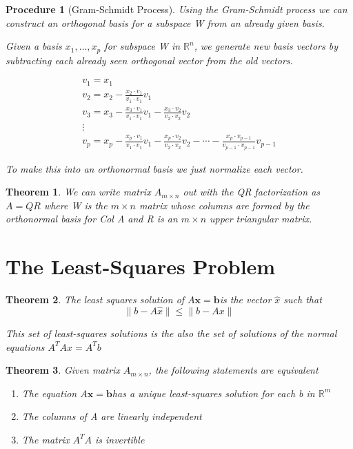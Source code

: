 \documentclass[12pt]{report}
\newtheorem{thm}{Theorem}
\newtheorem{proc}{Procedure}
\newcommand{\mtx}[3]{$#1_{#2\times #3}$}
\newcommand{\mateq}{$A\bm{x}=\bm{b}$}
\begin{document}
\begin{proc}[Gram-Schmidt Process]
Using the Gram-Schmidt process we can construct an orthogonal basis for a subspace W from an already given basis.

Given a basis ${x_1, \ldots, x_p}$ for subspace W in $\mathbb{R}^n$, we generate new basis vectors by subtracting each already seen orthogonal vector from the old vectors.

\begin{eqnarray*}
v_1 = x_1 \\
v_2 = x_2 - \frac{x_2 \cdot v_1}{v_1 \cdot v_1} v_1 \\
v_3 = x_3 - \frac{x_3 \cdot v_1}{v_1 \cdot v_1} v_1 - \frac{x_3 \cdot v_2}{v_2 \cdot v_2} v_2 \\
\vdots \\
v_p = x_p - \frac{x_p \cdot v_1}{v_1 \cdot v_1} v_1 - \frac{x_p \cdot v_2}{v_2 \cdot v_2} v_2 - \cdots - \frac{x_p \cdot v_{p-1}}{v_{p-1} \cdot v_{p-1}} v_{p-1}
\end{eqnarray*}

To make this into an orthonormal basis we just normalize each vector.

\end{proc}

\begin{thm}
We can write matrix \mtx{A}{m}{n} out with the QR factorization as $A=QR$ where W is the $m \times n$ matrix whose columns are formed by the orthonormal basis for Col A and R is an $m\times n$ upper triangular matrix.
\end{thm}

\section{The Least-Squares Problem}

\begin{thm}
The least squares solution of \mateq is the vector $\hat{x}$ such that
\begin{equation}
\|b-A\hat{x}\| \leq \|b-Ax\|
\end{equation}

This set of least-squares solutions is the also the set of solutions of the normal equations $A^TAx=A^Tb$

\end{thm}

\begin{thm}
Given matrix \mtx{A}{m}{n}, the following statements are equivalent

\begin{enumerate}
\item The equation \mateq has a unique least-squares solution for each b in $\mathbb{R}^m$
\item The columns of A are linearly independent
\item The matrix $A^TA$ is invertible
\end{enumerate}

\end{thm}
\end{document}
